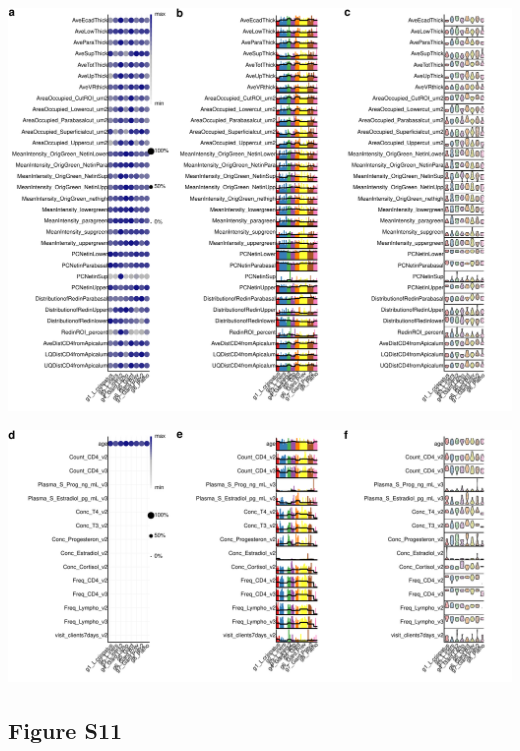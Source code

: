 \documentclass[
]{article}
\begin{document}
\includegraphics[width=1\linewidth]{manuscript_template_files/figure-latex/unnamed-chunk-20-1}

\includegraphics[width=1\linewidth]{manuscript_template_files/figure-latex/unnamed-chunk-21-1}

\clearpage

\hypertarget{figure-s11}{%
\subsection{Figure S11}\label{figure-s11}}
\end{document}
